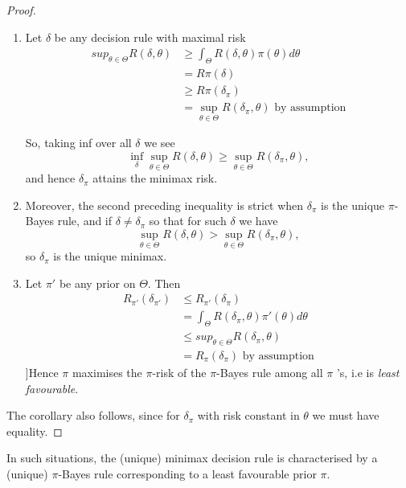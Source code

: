 \documentclass[a4paper]{article}
\begin{document}
\begin{proof}
	\begin{enumerate}[label=\roman*)]
		\item Let $\delta$ be any decision rule with maximal risk 
			\begin{align*}
				sup_{\theta\in \Theta} R(\delta,\theta) &\ge  \int_{\Theta} R(\delta,\theta)\pi(\theta)d\theta \\
				&= R\pi(\delta) \\
				&\ge R\pi(\delta_{\pi}) \\
				&= \sup_{\theta \in \Theta} R(\delta_{\pi},\theta) \text{ by assumption}
			\end{align*}

			So, taking inf over all $\delta$ we see
			\[
				\inf_{\delta} \sup_{\theta \in  \Theta} R(\delta,\theta) \ge  \sup_{\theta \in  \Theta} R(\delta_{\pi},\theta)
			,\]
			and hence $\delta_{\pi}$ attains the minimax risk.

		\item Moreover, the second preceding inequality is strict when $\delta_{\pi}$ is the unique $\pi$-Bayes rule, and if $\delta \neq \delta_{\pi}$ so that for such $\delta$ we have
			\[
				\sup_{\theta \in \Theta} R(\delta, \theta) > \sup_{\theta \in \Theta} R(\delta_{\pi},\theta)
			,\]
			so $\delta_{\pi}$ is the unique minimax.
		\item Let $\pi'$ be any prior on $\Theta$. Then
			\begin{align*}
				R_{\pi'}(\delta_{\pi'}) &\le R_{\pi'}(\delta_{\pi}) \\
				&= \int_{\Theta} R(\delta_{\pi}, \theta) \pi'(\theta)d\theta \\
				&\le sup_{\theta \in \Theta} R(\delta_{\pi},\theta) \\
				&= R_{\pi}(\delta_{\pi}) \text{ by assumption}
			\end{align*}
			]Hence $\pi$ maximises the $\pi$-risk of the $\pi$-Bayes rule among all $\pi$ 's, i.e is \textit{least favourable}.
	\end{enumerate}

	The corollary also follows, since for $\delta_{\pi}$ with risk constant in $\theta$ we must have equality.
\end{proof}

In such situations, the (unique) minimax decision rule is characterised by a (unique) $\pi$-Bayes rule corresponding to a least favourable prior $\pi$.
\end{document}
